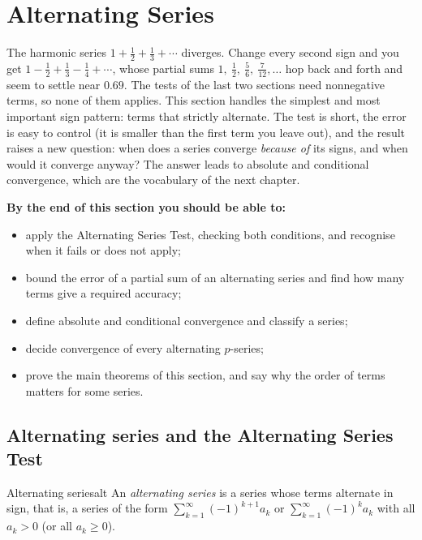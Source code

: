 \documentclass[11pt]{article}
\begin{document}
\section{Alternating Series}

\begin{guide}
The harmonic series $1+\frac12+\frac13+\cdots$ diverges. Change every second sign and you get $1-\frac12+\frac13-\frac14+\cdots$, whose partial sums $1,\ \frac12,\ \frac56,\ \frac7{12},\dots$ hop back and forth and seem to settle near $0.69$. The tests of the last two sections need nonnegative terms, so none of them applies. This section handles the simplest and most important sign pattern: terms that strictly alternate. The test is short, the error is easy to control (it is smaller than the first term you leave out), and the result raises a new question: when does a series converge \emph{because of} its signs, and when would it converge anyway? The answer leads to absolute and conditional convergence, which are the vocabulary of the next chapter.
\end{guide}

\textbf{By the end of this section you should be able to:}
\begin{itemize}
  \item apply the Alternating Series Test, checking both conditions, and recognise when it fails or does not apply;
  \item bound the error of a partial sum of an alternating series and find how many terms give a required accuracy;
  \item define absolute and conditional convergence and classify a series;
  \item decide convergence of every alternating $p$-series;
  \item prove the main theorems of this section, and say why the order of terms matters for some series.
\end{itemize}

\subsection*{Alternating series and the Alternating Series Test}

\begin{defn}{Alternating series}{alt}
An \emph{alternating series} is a series whose terms alternate in sign, that is, a series of the form $\sum_{k=1}^\infty(-1)^{k+1}a_k$ or $\sum_{k=1}^\infty(-1)^ka_k$ with all $a_k>0$ (or all $a_k\ge0$).
\end{defn}
\end{document}
